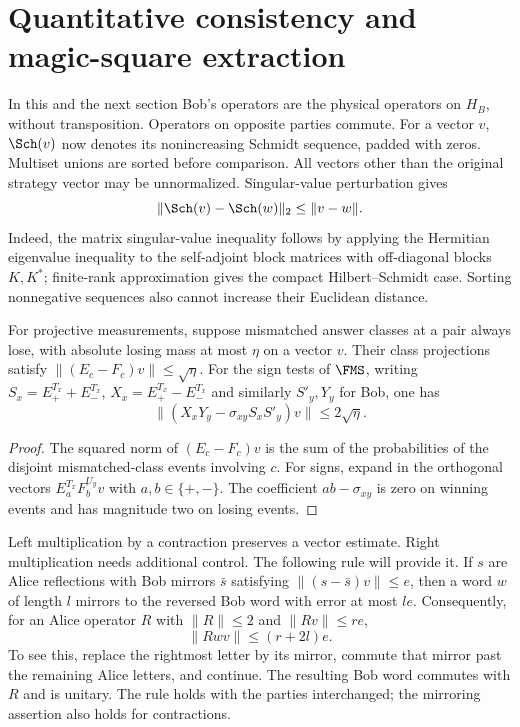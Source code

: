 \section{Quantitative consistency and magic-square extraction}\label{sec:extraction}
In this and the next section Bob's operators are the physical operators on
$H_B$, without transposition. Operators on opposite parties commute. For a
vector $v$, $\Sch(v)$ now denotes its nonincreasing Schmidt sequence, padded
with zeros. Multiset unions are sorted before comparison. All vectors other
than the original strategy vector may be unnormalized. Singular-value
perturbation gives
\begin{equation}\label{eq:singularperturbation}
\|\Sch(v)-\Sch(w)\|_2\leq\|v-w\|.
\end{equation}
Indeed, the matrix singular-value inequality follows by applying the
Hermitian eigenvalue inequality to the self-adjoint block matrices with
off-diagonal blocks $K,K^*$; finite-rank approximation gives the compact
Hilbert--Schmidt case. Sorting nonnegative sequences also cannot increase
their Euclidean distance.

\begin{lemma}\label{lem:consistency}
For projective measurements, suppose mismatched answer classes at a pair
always lose, with absolute losing mass at most $\eta$ on a vector $v$.
Their class projections satisfy $\|(E_c-F_c)v\|\leq\sqrt\eta$.
For the sign tests of $\FMS$, writing $S_x=E^{T_x}_++E^{T_x}_-$,
$X_x=E^{T_x}_+-E^{T_x}_-$ and similarly $S'_y,Y_y$ for Bob, one has
\[
\|(X_xY_y-\sigma_{xy}S_xS'_y)v\|\leq2\sqrt\eta.
\]
\end{lemma}
\begin{proof}
The squared norm of $(E_c-F_c)v$ is the sum of the probabilities of the
disjoint mismatched-class events involving $c$. For signs, expand in the
orthogonal vectors $E^{T_x}_aF^{U_y}_bv$ with $a,b\in\{+,-\}$.
The coefficient $ab-\sigma_{xy}$ is zero on winning events and has magnitude
two on losing events.
\end{proof}

Left multiplication by a contraction preserves a vector estimate. Right
multiplication needs additional control. The following rule will provide it.
If $s$ are Alice reflections with Bob mirrors $\bar s$ satisfying
$\|(s-\bar s)v\|\leq e$, then a word $w$ of length $l$ mirrors to the
reversed Bob word with error at most $le$. Consequently, for an Alice
operator $R$ with $\|R\|\leq2$ and $\|Rv\|\leq re$,
\begin{equation}\label{eq:context}
\|Rwv\|\leq(r+2l)e.
\end{equation}
To see this, replace the rightmost letter by its mirror, commute that
mirror past the remaining Alice letters, and continue. The resulting Bob
word commutes with $R$ and is unitary. The rule holds with the parties
interchanged; the mirroring assertion also holds for contractions.

